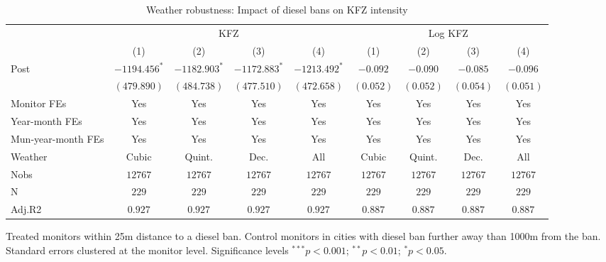 
\begin{table}[h]
\caption{Weather robustness: Impact of diesel bans on KFZ intensity}
\begin{center}
\begin{footnotesize}
\begin{threeparttable}
\begin{tabular}{l c c c c c c c c}
\toprule
& \multicolumn{4}{c}{KFZ} & \multicolumn{4}{c}{Log KFZ}  \\ \cmidrule(r){2-5} \cmidrule(r){6-9}
 & (1) & (2) & (3) & (4) & (1) & (2) & (3) & (4) \\
\midrule
Post   & $-1194.456^{*}$ & $-1182.903^{*}$ & $-1172.883^{*}$ & $-1213.492^{*}$ & $-0.092$  & $-0.090$  & $-0.085$  & $-0.096$  \\
       & $(479.890)$     & $(484.738)$     & $(477.510)$     & $(472.658)$     & $(0.052)$ & $(0.052)$ & $(0.054)$ & $(0.051)$ \\
\midrule
Monitor FEs   & Yes & Yes & Yes  & Yes & Yes & Yes & Yes & Yes     \\
Year-month FEs     & Yes & Yes & Yes  & Yes & Yes & Yes & Yes & Yes   \\
Mun-year-month FEs     & Yes & Yes & Yes  & Yes & Yes & Yes & Yes & Yes   \\
Weather     & Cubic & Quint. & Dec.  & All & Cubic & Quint. & Dec.  & All    \\ \midrule
Nobs   & $12767$         & $12767$         & $12767$         & $12767$         & $12767$   & $12767$   & $12767$   & $12767$   \\
N      & $229$           & $229$           & $229$           & $229$           & $229$     & $229$     & $229$     & $229$     \\
Adj.R2 & $0.927$         & $0.927$         & $0.927$         & $0.927$         & $0.887$   & $0.887$   & $0.887$   & $0.887$   \\
\bottomrule
\end{tabular}
\begin{tablenotes}[flushleft]
\tiny{\item Treated monitors within 25m distance to a diesel ban.
       Control monitors in cities with diesel ban further away than 1000m from the ban.
       Standard errors clustered at the monitor level.
       Significance levels $^{***}p<0.001$; $^{**}p<0.01$; $^{*}p<0.05$.}
\end{tablenotes}
\end{threeparttable}
\end{footnotesize}
\label{table:coefficients}
\end{center}
\end{table}
